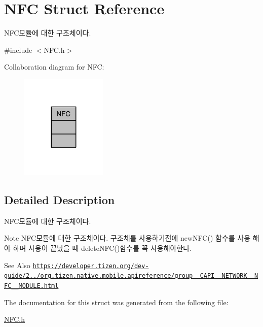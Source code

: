 \hypertarget{structNFC}{\section{N\-F\-C Struct Reference}
\label{structNFC}
}


N\-F\-C모듈에 대한 구조체이다.  




{\ttfamily \#include $<$N\-F\-C.\-h$>$}



Collaboration diagram for N\-F\-C\-:\nopagebreak
\begin{figure}[H]
\begin{center}
\leavevmode
\includegraphics[width=116pt]{d5/d97/structNFC__coll__graph}
\end{center}
\end{figure}


\subsection{Detailed Description}
N\-F\-C모듈에 대한 구조체이다. 

\begin{DoxyNote}{Note}
N\-F\-C모듈에 대한 구조체이다. 구조체를 사용하기전에 new\-N\-F\-C() 함수를 사용 해야 하며 사용이 끝났을 때 delete\-N\-F\-C()함수를 꼭 사용해야한다. 
\end{DoxyNote}
\begin{DoxySeeAlso}{See Also}
\href{https://developer.tizen.org/dev-guide/2.3.0/org.tizen.native.mobile.apireference/group__CAPI__NETWORK__NFC__MODULE.html}{\tt https\-://developer.\-tizen.\-org/dev-\/guide/2../org.\-tizen.\-native.\-mobile.\-apireference/group\-\_\-\-\_\-\-C\-A\-P\-I\-\_\-\-\_\-\-N\-E\-T\-W\-O\-R\-K\-\_\-\-\_\-\-N\-F\-C\-\_\-\-\_\-\-M\-O\-D\-U\-L\-E.\-html} 
\end{DoxySeeAlso}


The documentation for this struct was generated from the following file\-:\begin{DoxyCompactItemize}
\item 
\hyperlink{NFC_8h}{N\-F\-C.\-h}\end{DoxyCompactItemize}
